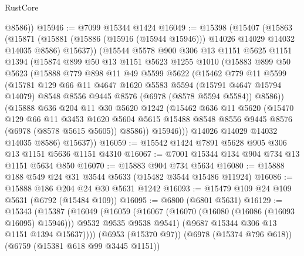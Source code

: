\begin{lexlean}{RustCore}
\begin{coremodule}
        @8586))
@15946 := @7099 @15344 @1424
@16049 := @15398
    (@15407
      (@15863
        (@15871
          (@15881 (@15886 (@15916 (@15944 @15946))) @14026 @14029 @14032 @14035 @8586)
          @15637))
      (@15544
        @5578
        @900
        @306
        @13
        @1151
        @5625
        @1151
        @1394
        (@15874
          @899
          @50
          @13
          @1151
          @5623
          @1255
          @1010
          (@15883
            @899
            @50
            @5623
            (@15888
              @779
              @898
              @11
              @49
              @5599
              @5622
              (@15462
                @779
                @11
                @5599
                (@15781
                  @129
                  @66
                  @11
                  @4647
                  @1620
                  @5583
                  @5594
                  (@15791 @4647 @15794 @14079)
                  @8548
                  @8556
                  @9445
                  @8576
                  (@6978 (@8578 @5594 @5584))
                  @8586))
              (@15888
                @636
                @204
                @11
                @30
                @5620
                @1242
                (@15462
                  @636
                  @11
                  @5620
                  (@15470
                    @129
                    @66
                    @11
                    @3453
                    @1620
                    @5604
                    @5615
                    @15488
                    @8548
                    @8556
                    @9445
                    @8576
                    (@6978 (@8578 @5615 @5605))
                    @8586))
                @15946)))
          @14026
          @14029
          @14032
          @14035
          @8586)
        @15637))
@16059 := @15542 @1424 @7891 @5628 @905 @306 @13 @1151 @5636 @1151 @4310
@16067 := @7001 @15344 @134 @904 @734 @13 @1151 @5634 @850
@16070 := @15883 @904 @734 @5634
@16080 := @15888 @188 @549 @24 @31 @3544 @5633 (@15482 @3544 @15486 @11924)
@16086 := @15888 @186 @204 @24 @30 @5631 @1242
@16093 := @15479 @109 @24 @109 @5631 (@6792 (@15484 @109))
@16095 := @6800 (@6801 @5631)
@16129 := @15343
    (@15387
      (@16049
        (@16059
          (@16067 (@16070 (@16080 (@16086 (@16093 @16095) @15946))) @9532 @9535 @9538 @9541)
          (@9687 @15344 @306 @13 @1151 @1394 @15637))))
    (@6953 (@15370 @97))
    (@6978 (@15374 @796 @618))
    (@6759 (@15381 @618 @99 @3445 @1151))

\end{coremodule}
\end{lexlean}
